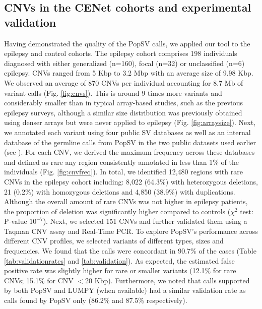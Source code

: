 \subsection*{CNVs in the CENet cohorts and experimental validation}
Having demonstrated the quality of the {\sf PopSV} calls, we applied our tool to the epilepsy and control cohorts.
The epilepsy cohort comprises 198 individuals diagnosed with either generalized (n=160), focal (n=32) or unclassified (n=6) epilepsy.
CNVs ranged from 5 Kbp to 3.2 Mbp with an average size of 9.98 Kbp.
We observed an average of 870 CNVs per individual accounting for 8.7 Mb of variant calls (Fig. \ref{fig:cnvs}).
This is around 9 times more variants and considerably smaller than in typical array-based studies\cite{Redon2006,Itsara2009}, such as the previous epilepsy surveys\cite{Mefford2011,Mefford2010,Helbig2014,Addis2016}, although a similar size distribution was previously obtained using denser arrays\cite{Conrad2010} but were never applied to epilepsy (Fig. \ref{fig:arraysize}).
Next, we annotated each variant using four public SV databases\cite{Sudmant2015a,Handsaker2015,Francioli2014,Sudmant2015} as well as an internal database of the germline calls from {\sf PopSV} in the two public datasets used earlier (see ).
For each CNV, we derived the maximum frequency across these databases and defined as rare any region consistently annotated in less than 1\% of the individuals (Fig. \ref{fig:cnvfreq}).
In total, we identified 12,480 regions with rare CNVs in the epilepsy cohort including: 8,022 (64.3\%) with heterozygous deletions, 21 (0.2\%) with homozygous deletions and 4,850 (38.9\%) with duplications.
Although the overall amount of rare CNVs was not higher in epilepsy patients, the proportion of deletion was significantly higher compared to controls ($\chi^2$ test: P-value $10^{-7}$).
Next, we selected 151 CNVs and further validated them using a Taqman CNV assay and Real-Time PCR.
To explore {\sf PopSV}'s performance across different CNV profiles, we selected variants of different types, sizes and frequencies.
We found that the calls were concordant in 90.7\% of the cases (Table \ref{tab:validationrates} and \ref{tab:validation}).
As expected, the estimated false positive rate was slightly higher for rare or smaller variants (12.1\% for rare CNVs; 15.1\% for CNV $<$20 Kbp).
Furthermore, we noted that calls supported by both {\sf PopSV} and {\sf LUMPY} (when available) had a similar validation rate as calls found by {\sf PopSV} only (86.2\% and 87.5\% respectively).

